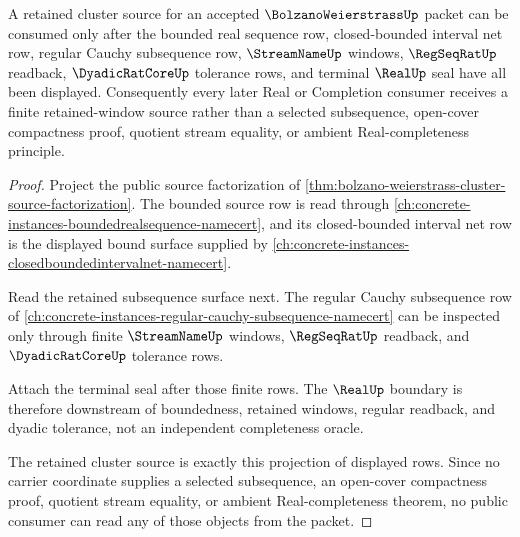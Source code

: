\begin{theorem}
\label{thm:bolzanoweierstrass-cluster-source-factorization-strengthening}
A retained cluster source for an accepted $\BolzanoWeierstrassUp$ packet can be consumed only after the bounded real sequence row, closed-bounded interval net row, regular Cauchy subsequence row, $\StreamNameUp$ windows, $\RegSeqRatUp$ readback, $\DyadicRatCoreUp$ tolerance rows, and terminal $\RealUp$ seal have all been displayed. Consequently every later Real or Completion consumer receives a finite retained-window source rather than a selected subsequence, open-cover compactness proof, quotient stream equality, or ambient Real-completeness principle.
\end{theorem}
\begin{proof}
Project the public source factorization of \autoref{thm:bolzano-weierstrass-cluster-source-factorization}. The bounded source row is read through \autoref{ch:concrete-instances-boundedrealsequence-namecert}, and its closed-bounded interval net row is the displayed bound surface supplied by \autoref{ch:concrete-instances-closedboundedintervalnet-namecert}.

Read the retained subsequence surface next. The regular Cauchy subsequence row of \autoref{ch:concrete-instances-regular-cauchy-subsequence-namecert} can be inspected only through finite $\StreamNameUp$ windows, $\RegSeqRatUp$ readback, and $\DyadicRatCoreUp$ tolerance rows.

Attach the terminal seal after those finite rows. The $\RealUp$ boundary is therefore downstream of boundedness, retained windows, regular readback, and dyadic tolerance, not an independent completeness oracle.

The retained cluster source is exactly this projection of displayed rows. Since no carrier coordinate supplies a selected subsequence, an open-cover compactness proof, quotient stream equality, or ambient Real-completeness theorem, no public consumer can read any of those objects from the packet.
\end{proof}

